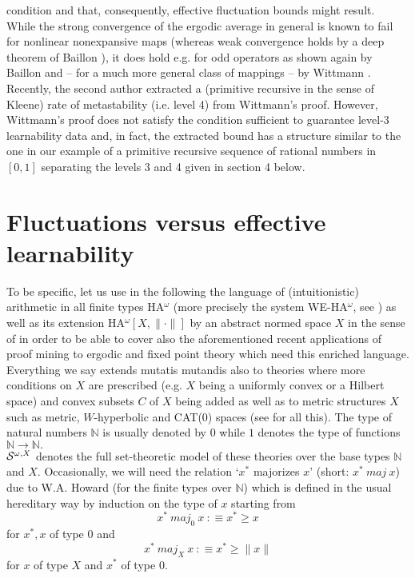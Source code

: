 \documentclass[1p]{elsarticle}
\newcommand{\NN}{\ensuremath{\mathbb{N}}}
\theoremstyle{plain}
\theoremstyle{definition}
\theoremstyle{remark}
\theoremstyle{definition}
\begin{document}
condition and that, consequently, effective fluctuation bounds might 
result. 
\\[1mm]  
While the strong convergence of the ergodic average in general is known 
to fail for nonlinear nonexpansive maps (whereas weak convergence 
holds by a deep theorem of Baillon \cite{Baillon(75)}), 
it does hold e.g. 
for odd operators as shown again by Baillon \cite{Baillon(76)} 
and -- for a much more 
general class of mappings -- by Wittmann \cite{Wittmann(90)}. 
Recently, the second author 
\cite{Safarik(11)} extracted 
a (primitive recursive in the sense of Kleene) rate of metastability 
(i.e. level 4) from Wittmann's proof. However, Wittmann's proof does 
not satisfy the condition sufficient to guarantee level-3 learnability 
data and, in fact, the extracted bound has a structure similar to the 
one in our example of a primitive recursive sequence of rational 
numbers in $[0,1]$ separating the 
levels 3 and 4 given in section 4 below. 



\section{Fluctuations versus effective learnability}
To be specific, let us use in the following the language of (intuitionistic) 
arithmetic in all finite types HA$^{\omega}$ (more precisely the system 
WE-HA$^{\omega}$, see \cite{Kohlenbach(book)}) as well as its extension HA$^{\omega}[X,\|\cdot\|]$ 
by an abstract normed space $X$ in the sense of \cite{Kohlenbach(metapaper),GerKoh06,Kohlenbach(book)} in order to be able to cover also the aforementioned 
recent applications of proof mining to ergodic and fixed point theory which 
need this enriched language. Everything we say extends mutatis mutandis also 
to theories where more conditions on $X$ are prescribed (e.g. $X$ being 
a uniformly convex or a Hilbert space) and convex subsets $C$ of $X$ being 
added as well as to metric structures $X$ 
such as metric, $W$-hyperbolic and CAT(0) spaces (see \cite{Kohlenbach(book)} 
for all this). The type of natural numbers $\NN$ is usually denoted by $0$ 
while $1$ denotes the type of functions $\NN\to\NN.$
\\[1mm] ${\cal S}^{\omega,X}$ denotes the full set-theoretic model of these 
theories over the base types $\NN$ and $X.$ Occasionally, we will need 
the relation `$x^*$ majorizes $x$' (short: $x^* \ maj \ x$) due to W.A. Howard 
(for the finite types over $\NN$)  
which is defined in the usual hereditary 
way by induction on the type of $x$ starting from 
\[ x^* \ maj_0 \ x\ :\equiv x^*\ge x \] for $x^*,x$ of type $0$ and 
\[ x^* \ maj_X \ x\ :\equiv x^* \ge \| x\|\] for $x$ of type $X$ and 
$x^*$ of type $0.$ 
\end{document}
